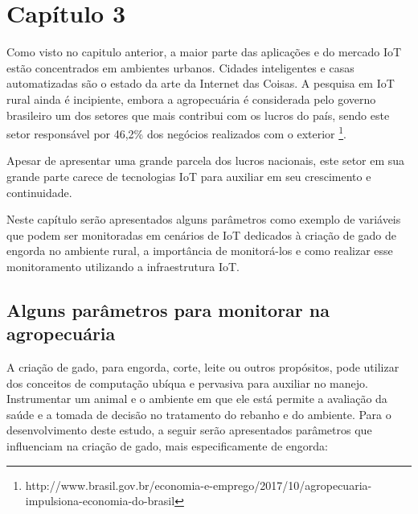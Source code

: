 \documentclass[
    hidelinks,
	12pt,				%
	openany,
	oneside, 
	a4paper,			%
	english,			%
	french,				%
	spanish,			%
	brazil				%
	]{abntex2}
\begin{document}

\setcounter{section}{0}
\chapter*[Capítulo 3]{Capítulo 3} \label{capitulo3}

Como visto no capitulo anterior, a maior parte das aplicações e do mercado IoT estão concentrados em ambientes urbanos. Cidades inteligentes e casas automatizadas são o estado da arte da Internet das Coisas. A pesquisa em IoT rural ainda é incipiente, embora a agropecuária é considerada pelo governo brasileiro um dos setores que mais contribui com os lucros do país, sendo este setor responsável por 46,2\% dos negócios realizados com o exterior \footnote{http://www.brasil.gov.br/economia-e-emprego/2017/10/agropecuaria-impulsiona-economia-do-brasil}. 

Apesar de apresentar uma grande parcela dos lucros nacionais, este setor em sua grande parte carece de tecnologias IoT para auxiliar em seu crescimento e continuidade. 

Neste capítulo serão apresentados alguns parâmetros como exemplo de variáveis que podem ser  monitoradas em cenários de IoT dedicados à   criação de gado de engorda no ambiente rural, a importância de monitorá-los e como realizar esse monitoramento utilizando a infraestrutura IoT.

\section{Alguns parâmetros para monitorar na agropecuária} \label{variaveis}

A criação de gado, para engorda, corte, leite ou outros propósitos, pode utilizar dos conceitos de computação ubíqua e pervasiva para auxiliar no manejo. Instrumentar um animal e o ambiente em que ele está permite a avaliação da saúde e a tomada de decisão no tratamento do rebanho e do ambiente. Para o desenvolvimento deste estudo, a seguir serão apresentados parâmetros que influenciam na criação de gado, mais especificamente de engorda:
\end{document}
